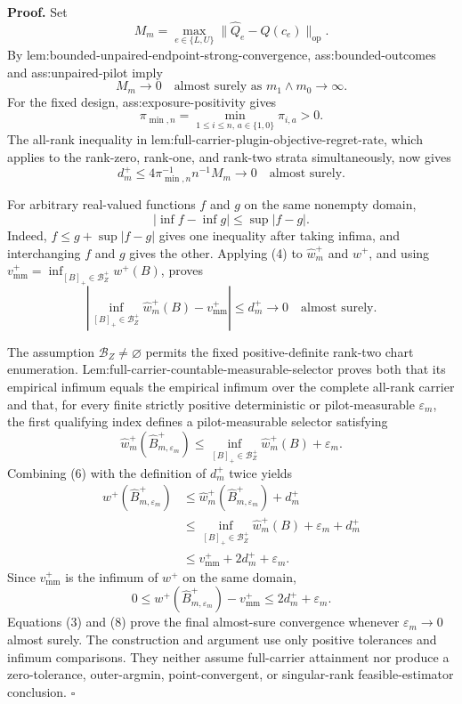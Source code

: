 \textbf{Proof.}
Set
\[
 M_m=\max_{e\in\{L,U\}}
 \lVert\widehat Q_e-Q(c_e)\rVert_{\mathrm{op}}.
\]
By lem:bounded-unpaired-endpoint-strong-convergence, ass:bounded-outcomes and ass:unpaired-pilot imply
\[
 M_m\longrightarrow0
 \quad\text{almost surely as }m_1\wedge m_0\to\infty.
\tag{1}
\]
For the fixed design, ass:exposure-positivity gives
\[
 \pi_{\min,n}=\min_{1\le i\le n,\,a\in\{1,0\}}\pi_{i,a}>0.
\tag{2}
\]
The all-rank inequality in lem:full-carrier-plugin-objective-regret-rate, which applies to the rank-zero, rank-one, and rank-two strata simultaneously, now gives
\[
 d_m^+
 \le4\pi_{\min,n}^{-1}n^{-1}M_m
 \longrightarrow0
 \quad\text{almost surely}.
\tag{3}
\]

For arbitrary real-valued functions \(f\) and \(g\) on the same nonempty domain,
\[
 \left|\inf f-\inf g\right|\le\sup|f-g|.
\tag{4}
\]
Indeed, \(f\le g+\sup|f-g|\) gives one inequality after taking infima, and interchanging \(f\) and \(g\) gives the other.  Applying (4) to \(\widehat w_m^+\) and \(w^+\), and using
\(v_{\mathrm{mm}}^+=\inf_{[B]_+\in\mathcal B_Z^+}w^+(B)\), proves
\[
 \left|
 \inf_{[B]_+\in\mathcal B_Z^+}\widehat w_m^+(B)
 -v_{\mathrm{mm}}^+
 \right|
 \le d_m^+\longrightarrow0
 \quad\text{almost surely}.
\tag{5}
\]

The assumption \(\mathcal B_Z\ne\varnothing\) permits the fixed positive-definite rank-two chart enumeration.  Lem:full-carrier-countable-measurable-selector proves both that its empirical infimum equals the empirical infimum over the complete all-rank carrier and that, for every finite strictly positive deterministic or pilot-measurable \(\varepsilon_m\), the first qualifying index defines a pilot-measurable selector satisfying
\[
 \widehat w_m^+(\widehat B_{m,\varepsilon_m}^+)
 \le
 \inf_{[B]_+\in\mathcal B_Z^+}\widehat w_m^+(B)+\varepsilon_m.
\tag{6}
\]
Combining (6) with the definition of \(d_m^+\) twice yields
\[
\begin{aligned}
w^+(\widehat B_{m,\varepsilon_m}^+)
&\le \widehat w_m^+(\widehat B_{m,\varepsilon_m}^+)+d_m^+\\
&\le \inf_{[B]_+\in\mathcal B_Z^+}\widehat w_m^+(B)
   +\varepsilon_m+d_m^+\\
&\le v_{\mathrm{mm}}^++2d_m^++\varepsilon_m.
\end{aligned}
\tag{7}
\]
Since \(v_{\mathrm{mm}}^+\) is the infimum of \(w^+\) on the same domain,
\[
 0\le
 w^+(\widehat B_{m,\varepsilon_m}^+)-v_{\mathrm{mm}}^+
 \le2d_m^++\varepsilon_m.
\tag{8}
\]
Equations (3) and (8) prove the final almost-sure convergence whenever \(\varepsilon_m\to0\) almost surely.  The construction and argument use only positive tolerances and infimum comparisons.  They neither assume full-carrier attainment nor produce a zero-tolerance, outer-argmin, point-convergent, or singular-rank feasible-estimator conclusion. \(\square\)